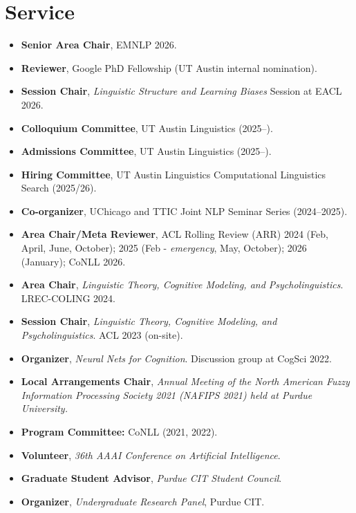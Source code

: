 \documentclass[11pt]{article}
\begin{document}
\section*{Service}
\begin{itemize}
    \item \textbf{Senior Area Chair}, EMNLP 2026.
    \item \textbf{Reviewer}, Google PhD Fellowship (UT Austin internal nomination).
    \item \textbf{Session Chair}, \textit{Linguistic Structure and Learning Biases} Session at EACL 2026.
    \item \textbf{Colloquium Committee}, UT Austin Linguistics (2025--).
    \item \textbf{Admissions Committee}, UT Austin Linguistics (2025--).
    \item \textbf{Hiring Committee}, UT Austin Linguistics Computational Linguistics Search (2025/26).
    \item \textbf{Co-organizer}, UChicago and TTIC Joint NLP Seminar Series (2024--2025).
    \item \textbf{Area Chair/Meta Reviewer}, ACL Rolling Review (ARR) 2024 (Feb, April, June, October); 2025 (Feb - \textit{emergency}, May, October); 2026 (January); CoNLL 2026.
    \item \textbf{Area Chair}, \textit{Linguistic Theory, Cognitive Modeling, and Psycholinguistics}. LREC-COLING 2024.
    \item \textbf{Session Chair}, \textit{Linguistic Theory, Cognitive Modeling, and Psycholinguistics}. ACL 2023 (on-site).
    \item \textbf{Organizer}, \textit{Neural Nets for Cognition}. Discussion group at CogSci 2022.
    \item \textbf{Local Arrangements Chair}, \textit{Annual Meeting of the North American Fuzzy Information Processing Society 2021 (NAFIPS 2021) held at Purdue University.}
    \item \textbf{Program Committee:} CoNLL (2021, 2022).
    \item  \textbf{Volunteer}, \textit{36th AAAI Conference on Artificial Intelligence}.
    \item \textbf{Graduate Student Advisor}, \textit{Purdue CIT Student Council}.
    \item \textbf{Organizer}, \textit{Undergraduate Research Panel}, Purdue CIT.
\end{itemize}
\end{document}
